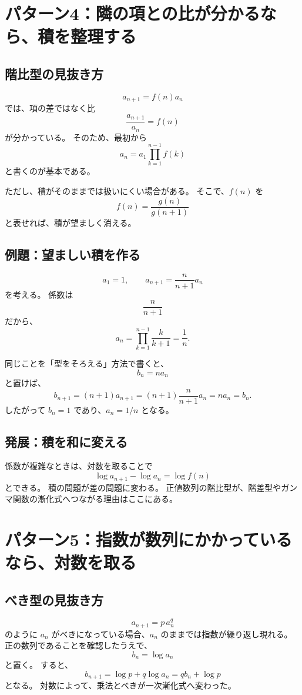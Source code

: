 \section{パターン4：隣の項との比が分かるなら、積を整理する}

\subsection{階比型の見抜き方}

\[
  a_{n+1}=f(n)a_n
\]
では、項の差ではなく比
\[
  \frac{a_{n+1}}{a_n}=f(n)
\]
が分かっている。
そのため、最初から
\[
  a_n=a_1\prod_{k=1}^{n-1}f(k)
\]
と書くのが基本である。

ただし、積がそのままでは扱いにくい場合がある。
そこで、$f(n)$ を
\[
  f(n)=\frac{g(n)}{g(n+1)}
\]
と表せれば、積が望ましく消える。

\subsection{例題：望ましい積を作る}

\[
  a_1=1,\qquad
  a_{n+1}=\frac{n}{n+1}a_n
\]
を考える。
係数は
\[
  \frac{n}{n+1}
\]
だから、
\[
  a_n
  =\prod_{k=1}^{n-1}\frac{k}{k+1}
  =\frac1n.
\]

同じことを「型をそろえる」方法で書くと、
\[
  b_n=na_n
\]
と置けば、
\[
  b_{n+1}
  =(n+1)a_{n+1}
  =(n+1)\frac{n}{n+1}a_n
  =na_n=b_n.
\]
したがって $b_n=1$ であり、$a_n=1/n$ となる。

\subsection{発展：積を和に変える}

係数が複雑なときは、対数を取ることで
\[
  \log a_{n+1}-\log a_n=\log f(n)
\]
とできる。
積の問題が差の問題に変わる。
正値数列の階比型が、階差型やガンマ関数の漸化式へつながる理由はここにある。

\section{パターン5：指数が数列にかかっているなら、対数を取る}

\subsection{べき型の見抜き方}

\[
  a_{n+1}=p\,a_n^q
\]
のように $a_n$ がべきになっている場合、$a_n$ のままでは指数が繰り返し現れる。
正の数列であることを確認したうえで、
\[
  b_n=\log a_n
\]
と置く。
すると、
\[
  b_{n+1}
  =\log p+q\log a_n
  =q b_n+\log p
\]
となる。
対数によって、乗法とべきが一次漸化式へ変わった。

